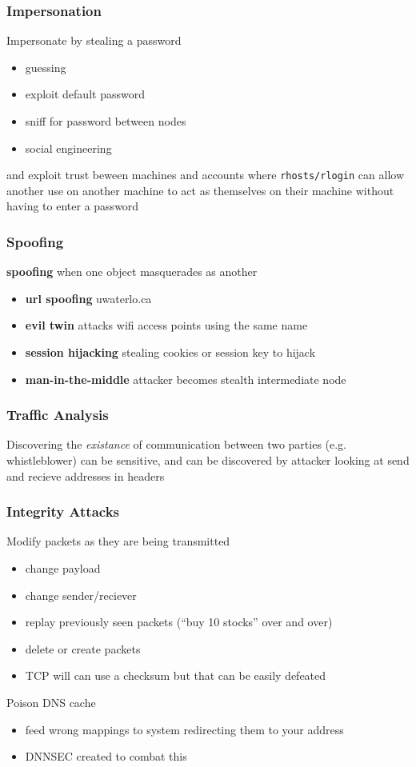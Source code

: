 \documentclass[]{article}
\theoremstyle{definition}
\begin{document}
	\subsubsection{Impersonation}
	Impersonate by stealing a password
	\begin{itemize}
		\item guessing
		\item exploit default password
		\item sniff for password between nodes
		\item social engineering
	\end{itemize}
	and exploit trust beween machines and accounts where \lstinline|rhosts/rlogin| can allow another use on another machine to act as themselves on their machine without having to enter a password

	\subsubsection{Spoofing}
	\textbf{spoofing} when one object masquerades as another
	\begin{itemize}
		\item \textbf{url spoofing} uwaterlo.ca
		\item \textbf{evil twin} attacks wifi access points using the same name
		\item \textbf{session hijacking} stealing cookies or session key to hijack
		\item \textbf{man-in-the-middle} attacker becomes stealth intermediate node
	\end{itemize}

	\subsubsection{Traffic Analysis}
	Discovering the \textit{existance} of communication between two parties (e.g. whistleblower) can be sensitive, and can be discovered by attacker looking at send and recieve addresses in headers

	\subsubsection{Integrity Attacks}
	Modify packets as they are being transmitted
	\begin{itemize}
		\item change payload
		\item change sender/reciever
		\item replay previously seen packets (``buy 10 stocks'' over and over)
		\item delete or create packets
		\item TCP will can use a checksum but that can be easily defeated
	\end{itemize}
	Poison DNS cache
	\begin{itemize}
		\item feed wrong mappings to system redirecting them to your address
		\item DNNSEC created to combat this
	\end{itemize}
\end{document}
